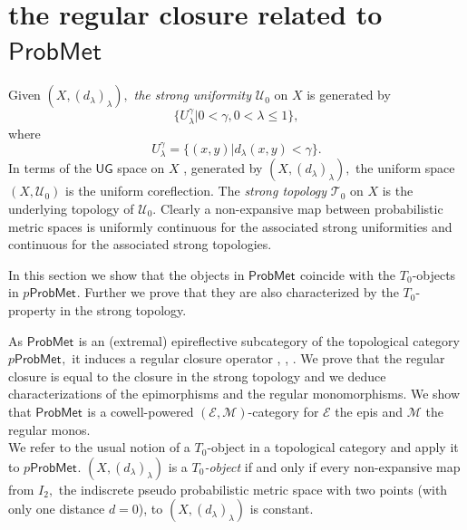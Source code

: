 \documentclass[12pt,a4paper]{amsart}
\theoremstyle{theorem}
\theoremstyle{definition}
\newcommand{\uuu}{\ensuremath{\mathcal{U}}}
\newcommand{\PM}{\ensuremath{\mathsf{ProbMet_{}}}}
\renewcommand{\l}{\ensuremath{\lambda}}
\begin{document}
{\section{the regular closure related to $\PM$}
Given $(X, (d_\l)_\l),$ \emph{the strong uniformity} \cite {SS} $\mathcal{U}_0$ on $X$ is generated by $$\{ U_\l^\gamma | 0 < \gamma, 0< \l \leq 1 \},$$  where $$U_\l^\gamma = \{ (x,y) | d_\l (x,y) < \gamma\}.$$ In terms of the $\mathsf{UG}$  space on $X$ \cite{CL2}, generated by $(X, (d_\l)_\l),$ the uniform space $(X,\uuu_0)$ is the uniform coreflection. The \emph{strong topology} $\mathcal{T}_0$ on $X$ is the underlying topology of $\mathcal{U}_0.$ Clearly a non-expansive map between probabilistic metric spaces is uniformly continuous for the associated strong uniformities and continuous for the associated strong topologies.



In this section we show that the objects in $\PM$ coincide with the $T_0$-objects in $p\PM.$
Further we prove that they are also characterized by the $T_0$-property in the strong topology.

As $\PM$ is an (extremal) epireflective subcategory of the topological category $p\PM,$ it induces a regular closure operator \cite{DG}, \cite{DT}, \cite{DGT}. We prove that the regular closure is equal to the closure in the strong topology and we deduce characterizations of the epimorphisms and the regular monomorphisms. We show that $\PM$ is a cowell-powered $(\mathcal{E}, \mathcal{M})$-category for $\mathcal{E}$ the epis and $\mathcal{M}$ the regular monos.\\

We refer to the usual notion of a $T_0$-object in a topological category \cite{M} and apply it to $p\PM.$ 
$(X, (d_\l)_\l)$ is a \emph{$T_0$-object} if and only if every non-expansive map from $I_2,$ the indiscrete pseudo probabilistic metric space with two points (with only one distance $d=0$), to $(X,( d_\l)_\l)$ is constant.


}
\end{document}
